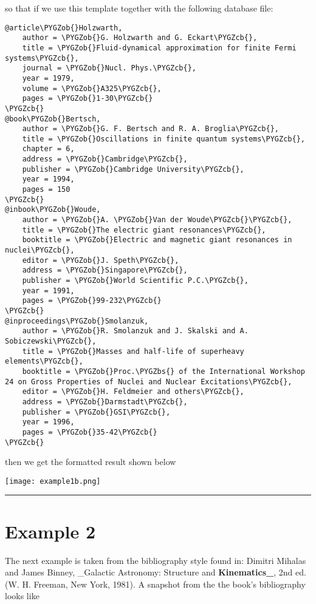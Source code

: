 \documentclass[letterpaper,10pt,english]{sphinxmanual}
\def\PYGZbs{\char`\\}
\def\PYGZob{\char`\{}
\def\PYGZcb{\char`\}}
\begin{document}
so that if we use this template together with the following database file:

\begin{Verbatim}[commandchars=\\\{\}]
@article\PYGZob{}Holzwarth,
    author = \PYGZob{}G. Holzwarth and G. Eckart\PYGZcb{},
    title = \PYGZob{}Fluid-dynamical approximation for finite Fermi systems\PYGZcb{},
    journal = \PYGZob{}Nucl. Phys.\PYGZcb{},
    year = 1979,
    volume = \PYGZob{}A325\PYGZcb{},
    pages = \PYGZob{}1-30\PYGZcb{}
\PYGZcb{}
@book\PYGZob{}Bertsch,
    author = \PYGZob{}G. F. Bertsch and R. A. Broglia\PYGZcb{},
    title = \PYGZob{}Oscillations in finite quantum systems\PYGZcb{},
    chapter = 6,
    address = \PYGZob{}Cambridge\PYGZcb{},
    publisher = \PYGZob{}Cambridge University\PYGZcb{},
    year = 1994,
    pages = 150
\PYGZcb{}
@inbook\PYGZob{}Woude,
    author = \PYGZob{}A. \PYGZob{}Van der Woude\PYGZcb{}\PYGZcb{},
    title = \PYGZob{}The electric giant resonances\PYGZcb{},
    booktitle = \PYGZob{}Electric and magnetic giant resonances in nuclei\PYGZcb{},
    editor = \PYGZob{}J. Speth\PYGZcb{},
    address = \PYGZob{}Singapore\PYGZcb{},
    publisher = \PYGZob{}World Scientific P.C.\PYGZcb{},
    year = 1991,
    pages = \PYGZob{}99-232\PYGZcb{}
\PYGZcb{}
@inproceedings\PYGZob{}Smolanzuk,
    author = \PYGZob{}R. Smolanzuk and J. Skalski and A. Sobiczewski\PYGZcb{},
    title = \PYGZob{}Masses and half-life of superheavy elements\PYGZcb{},
    booktitle = \PYGZob{}Proc.\PYGZbs{} of the International Workshop 24 on Gross Properties of Nuclei and Nuclear Excitations\PYGZcb{},
    editor = \PYGZob{}H. Feldmeier and others\PYGZcb{},
    address = \PYGZob{}Darmstadt\PYGZcb{},
    publisher = \PYGZob{}GSI\PYGZcb{},
    year = 1996,
    pages = \PYGZob{}35-42\PYGZcb{}
\PYGZcb{}
\end{Verbatim}

then we get the formatted result shown below

\texttt{[image: example1b.png]}


\bigskip\hrule{}\bigskip



\section{Example 2}
\label{examples:example-2}
The next example is taken from the bibliography style found in: Dimitri Mihalas and James Binney, \_Galactic Astronomy: Structure and {\color{red}\bfseries{}Kinematics\_}, 2nd ed. (W. H. Freeman, New York, 1981). A snapshot from the the book's bibliography looks like
\end{document}
